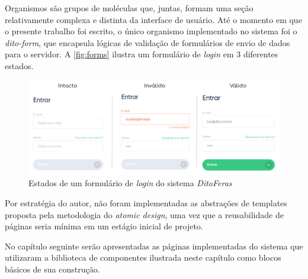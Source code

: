 Organismos são grupos de moléculas que, juntas, formam uma seção relativamente complexa e distinta da interface de usuário. Até o momento em que o presente trabalho foi escrito, o único organismo implementado no sistema foi o \textit{dito-form}, que encapsula lógicas de validação de formulários de envio de dados para o servidor. A \autoref{fig:forms} ilustra um formulário de \textit{login} em 3 diferentes estados.

\begin{figure}
  \begin{center}
	  \includegraphics[width=\linewidth]{./04-figuras/06_biblioteca_componentes/forms.png}
	\end{center}
  \caption{Estados de um formulário de \textit{login} do sistema \textit{DitoFeras}}
  \label{fig:forms}
\end{figure}

Por estratégia do autor, não foram implementadas as abstrações de templates proposta pela metodologia do \textit{atomic design}, uma vez que a reusabilidade de páginas seria mínima em um estágio inicial de projeto.

No capítulo seguinte serão apresentadas as páginas implementadas do sistema que utilizaram a biblioteca de componentes ilustrada neste capítulo como blocos básicos de sua construção.